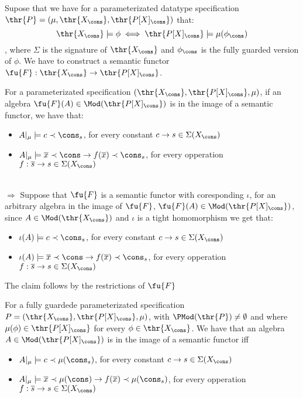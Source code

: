 \begin{PROOF}
Supose that we have for a parameterizated datatype specification $\thr{P} = (\mu,\thr{X_\cons},\thr{P[X]_\cons})$ that:
	\[ \thr{X_\cons}\models \phi \iff \thr{P[X]_\cons} \models \mu(\phi_\cons )\]
, where $\Sigma$ is the signature of $\thr{X_\cons}$ and $\phi_\cons$ is the fully guarded version of $\phi$. We have to construct a semantic functor $\fu{F}: \thr{X_\cons} \to \thr{P[X]_\cons}$.


\end{PROOF}


\begin{lemma}
\label{le:consclosed}
For a parameterizated specification
	$(\thr{X_\cons}, \thr{P[X]_\cons}, \mu)$, if an algebra $\fu{F}(A) \in \Mod(\thr{P[X]_\cons})$ is in the image of a semantic functor, we have that:
	\begin{itemize}
	\item $A|_\mu \models c \prec \cons_s$, for every constant $c \to s \in \Sigma(X_\cons)$
	\item $A|_\mu \models \overline{x} \prec \cons \to f(\overline{x}) \prec \cons_s$, for every opperation $f:\overline{s} \to s \in \Sigma(X_\cons)$
	\end{itemize}
\end{lemma}

\begin{PROOF}\\
$\Rightarrow$ Suppose that $\fu{F}$ is a semantic functor with coresponding $\iota$, for an arbitrary algebra in the image of $\fu{F}$, $\fu{F}(A) \in \Mod(\thr{P[X]_\cons})$, since $A \in \Mod(\thr{X_\cons})$ and $\iota$ is a tight homomorphism we get that:		\begin{itemize}
	\item $\iota(A) \models c \prec \cons_s$, for every constant $c \to s \in \Sigma(X_\cons)$
	\item $\iota(A) \models \overline{x} \prec \cons \to f(\overline{x}) \prec \cons_s$, for every opperation $f:\overline{s} \to s \in \Sigma(X_\cons)$
	\end{itemize}
The claim follows by the restrictions of $\fu{F}$\\
\end{PROOF}

\begin{proposition}
For a fully guardede parameterizated specification
	$P=(\thr{X_\cons}, \thr{P[X]_\cons}, \mu)$, with $\PMod(\thr{P}) \not= \emptyset$ and where $\mu(\phi) \in \thr{P[X]_\cons}$ for every $\phi \in \thr{X_\cons}$. We have that an algebra $A \in \Mod(\thr{P[X]_\cons})$ is in the image of a semantic functor iff
	\begin{itemize}
	\item $A|_\mu \models c \prec \mu(\cons_s)$, for every constant $c \to s \in \Sigma(X_\cons)$
	\item $A|_\mu \models \overline{x} \prec \mu(\cons) \to f(\overline{x}) \prec \mu(\cons_s)$, for every opperation $f:\overline{s} \to s \in \Sigma(X_\cons)$
	\end{itemize}
\end{proposition}

